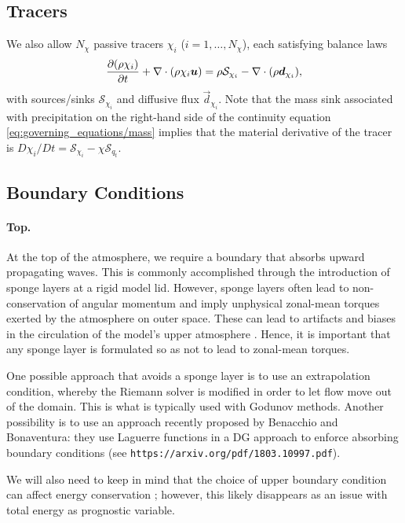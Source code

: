 \documentclass{article}
\begin{document}
\subsection{Tracers}

We also allow $N_\chi$ passive tracers $\chi_i$ ($i=1, \dots, N_\chi$), each satisfying balance laws
\begin{equation}
\frac{\partial (\rho \chi_i)}{\partial t} + \nabla \cdot \left(\rho \chi_i \boldsymbol{{u}} \right) = \rho \mathcal{S}_{\chi_i} - \nabla \cdot (\rho \boldsymbol{{d}}_{\chi_i}),   
\label{eq:tracers}
\end{equation}
with sources/sinks $\mathcal{S}_{\chi_i}$ and diffusive flux $\vec{d}_{\chi_i}$. Note that the mass sink associated with precipitation on the right-hand side of the continuity equation \eqref{eq:governing_equations/mass} implies that the material derivative of the tracer is $D\chi_i/Dt = \mathcal{S}_{\chi_i} - \chi \mathcal{S}_{q_t}$.
 
\subsection{Boundary Conditions}

\paragraph{Top.} At the top of the atmosphere, we require a boundary that absorbs upward propagating waves. This is commonly accomplished through the introduction of sponge layers at a rigid model lid. However, sponge layers often lead to non-conservation of angular momentum and imply unphysical zonal-mean torques exerted by the atmosphere on outer space. These can lead to artifacts and biases in the circulation of the model's upper atmosphere \citep[e.g.,][]{Shepherd96a}. Hence, it is important that any sponge layer is formulated so as not to lead to zonal-mean torques. 

One possible approach that avoids a sponge layer is to use an extrapolation condition, whereby the Riemann solver is modified in order to let flow move out of the domain. This is what is typically used with Godunov methods.  Another possibility is to use an approach recently proposed by Benacchio and Bonaventura: they use Laguerre functions in a DG approach to enforce absorbing boundary conditions (see \texttt{https://arxiv.org/pdf/1803.10997.pdf}).

We will also need to keep in mind that the choice of upper boundary condition can affect energy conservation \citep[e.g.,][]{Staniforth03a}; however, this likely disappears as an issue with total energy as prognostic variable.
\end{document}
